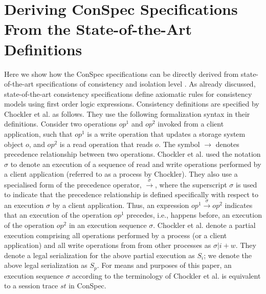 \documentclass{sig-alternate-05-2015}
\begin{document}
\section{Deriving ConSpec Specifications From the State-of-the-Art Definitions}\label{sec:derive}
 Here we show how the ConSpec specifications can be directly derived from state-of-the-art specifications of
 consistency and isolation level \cite{Chockler2000, Terry:1994:SGW:645792.668302}. As already discussed,
 state-of-the-art consistency specifications define axiomatic rules for consistency models using first order
 logic expressions.  Consistency definitions are specified by Chockler et al. \cite{Chockler2000} as follows.
 They use the following formalization syntax in their definitions. Consider two operations $\mathit{op}^1$ and
 $\mathit{op}^2$ invoked from a client application, such that $\mathit{op}^1$ is a write operation that updates
 a storage system object $o$, and $\mathit{op}^2$ is a read operation that reads $o$. The symbol $\rightarrow$ denotes
  precedence relationship \cite{Bailis:2013:BCC:2463676.2465279} between two operations. Chockler et al. used the
  notation $\sigma$ to denote an execution of a sequence of read and write operations performed by a client
  application (referred to as a  process by Chockler). They also use
  a specialised form of the precedence operator, $\xrightarrow{\sigma}$, where the superscript $\sigma$
  is used to indicate that the precedence relationship is defined specifically with respect to  an execution
  $\sigma$ by a client application.  Thus, an expression $\mathit{op}^1 \xrightarrow{\sigma} \mathit{op}^2$
  indicates that an execution of the operation $\mathit{op}^1$ precedes, i.e., happens before, an
  execution of the operation $\mathit{op}^2$ in an execution sequence $\sigma$. %
 Chockler et al. denote a partial
    execution comprising all operations performed by a process (or a client application) and all write operations from
    from other processes as $\sigma |i + w$. They denote a legal serialization for the above partial execution as $S_i$;
    we denote the above legal serialization as $S_p$.  For means and
   purposes of this paper, an execution sequence $\sigma$ according to the terminology of Chockler et al. is
   equivalent to a session trace $\mathit{st}$ in ConSpec. %
\end{document}
